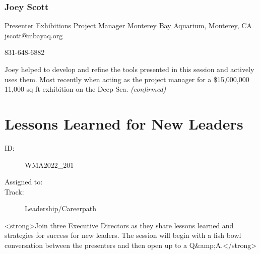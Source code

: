 \documentclass{report}
\begin{document}
              

              
                \subsubsection*{ Joey Scott }
                Presenter\newline
                Exhibitions Project Manager\newline
                Monterey Bay Aquarium, Monterey, CA
                \newline
                jscott@mbayaq.org\newline
                
                831-648-6882\newline

                Joey helped to develop and refine the tools presented in this session and actively uses them. Most recently when acting as the project manager for a \$15,000,000 11,000 sq ft exhibition on the Deep Sea.
                \emph{ (confirmed) }
              

              

              

              
        
          \newpage
          \section{ Lessons Learned for New Leaders }
            \begin{description}
              \item [ID:]
              WMA2022\_201

              \item [Assigned to:]
                \item [Track:]Leadership/Careerpath~
              \end{description}

              <strong>Join three Executive Directors as they share lessons learned and strategies for success for new leaders. The session will begin with a fish bowl conversation between the presenters and then open up to a Q\&amp;A.</strong>
\end{document}
